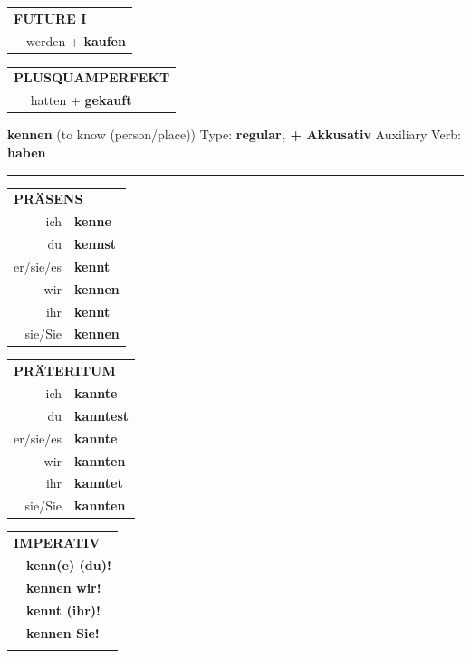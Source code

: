 \documentclass[10pt,a4paper]{revtex4-2}
\begin{document}
\begin{verbbox-acc}
\begin{tabular}{rl}
    \multicolumn{2}{l}{\textbf{FUTURE I} }\\
   & werden + \textbf{kaufen}\\
 
  \end{tabular}
\hfill
   \begin{tabular}{rl}
      \multicolumn{2}{l}{\textbf{PLUSQUAMPERFEKT}}\\
   & hatten + \textbf{gekauft}\\
  \end{tabular}
  
  \vspace{-5pt}


\end{verbbox-acc}

\begin{verbbox-acc}
    {\Large \bf kennen} (to know (person/place)) \hfill Type: \textbf{regular, + Akkusativ} \hfill Auxiliary Verb: \textbf{haben} 
    
     \vspace{5pt}

    \hrule
    
    \vspace{5pt}

  \begin{tabular}{rl}
     \multicolumn{2}{l}{\textbf{PRÄSENS} }\\
    ich & \textbf{kenne}\\
    du & \textbf{kennst}\\
    er/sie/es & \textbf{kennt}\\
    wir & \textbf{kennen}\\
    ihr & \textbf{kennt}\\
    sie/Sie & \textbf{kennen}\\
  \end{tabular}
  \hfill
     \begin{tabular}{rl}
    \multicolumn{2}{l}{\textbf{PRÄTERITUM} }\\
    ich & \textbf{kannte}\\
    du & \textbf{kanntest}\\
    er/sie/es & \textbf{kannte}\\
    wir & \textbf{kannten}\\
    ihr & \textbf{kanntet}\\
    sie/Sie & \textbf{kannten}\\
  \end{tabular}
  \hfill
  \begin{tabular}{rl}
     \multicolumn{2}{l}{\textbf{IMPERATIV} }\\
   & \textbf{kenn(e) (du)!}\\
   & \textbf{kennen wir!}\\
   & \textbf{kennt (ihr)!}\\
   & \textbf{kennen Sie!}\\
   & \vspace{10pt}
  \end{tabular}


\end{verbbox-acc}
\end{document}
